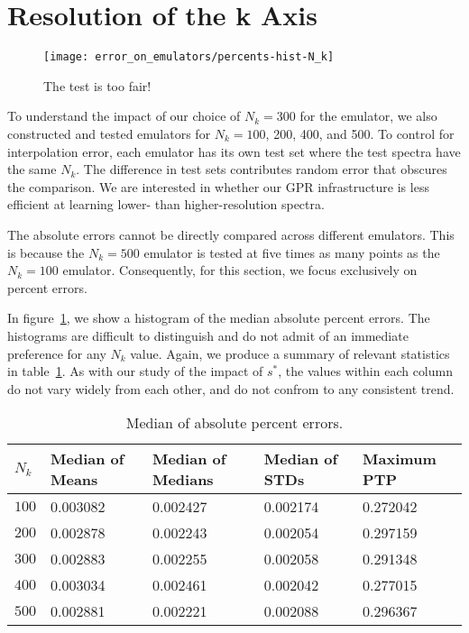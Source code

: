 \section{Resolution of the k Axis}

\begin{figure}[ht!]
  \centering
  \texttt{[image: error\_on\_emulators/percents-hist-N\_k]}
  \caption[Impact of $N_k$ on Accuracy]{The test is too fair!}
  \label{fig: Nk_experiment}
\end{figure}

To understand the impact of our choice of $N_k = 300$ for the emulator, we
also constructed and tested emulators for $N_k = 100$, 200, 400, and 500.
To control for interpolation error, each emulator has its own test set where
the test spectra have the same $N_k$. The
difference in test sets contributes random error that obscures the comparison.
We are interested in whether our GPR infrastructure is less efficient at
learning lower- than higher-resolution spectra.

The absolute errors cannot be directly compared across different emulators.
This is because the $N_k = 500$ emulator is tested at five times as many
points as the $N_k = 100$ emulator. Consequently, for this section, we focus
exclusively on percent errors.

In figure~\ref{fig: Nk_experiment}, we show a histogram of the median absolute
percent errors. The histograms are difficult to distinguish and do not admit
of an immediate preference for any $N_k$ value. Again, we produce a summary
of relevant statistics in table~\ref{tab: Nk_experiment_percerr_stats}. As
with our study of the impact of $s^*$, the values within each column do not
vary widely from each other, and do not confrom to any consistent trend.

\begin{table}[ht!]
\centering
\begin{tabular}{l|l|l|l|l}
\hline
$N_k$ & Median of Means & Median of Medians & Median of STDs & Maximum PTP \\ \hline
$100$ & 0.003082 & 0.002427 & 0.002174 & 0.272042 \\
$200$ & 0.002878 & 0.002243 & 0.002054 & 0.297159 \\
$300$ & 0.002883 & 0.002255 & 0.002058 & 0.291348 \\
$400$ & 0.003034 & 0.002461 & 0.002042 & 0.277015 \\
$500$ & 0.002881 & 0.002221 & 0.002088 & 0.296367 \\
\end{tabular}
	\cprotect\caption[$N_k$ Experiment: Percent Error Statistics]{Median of
		absolute percent errors.}
 \label{tab: Nk_experiment_percerr_stats}
\end{table}


